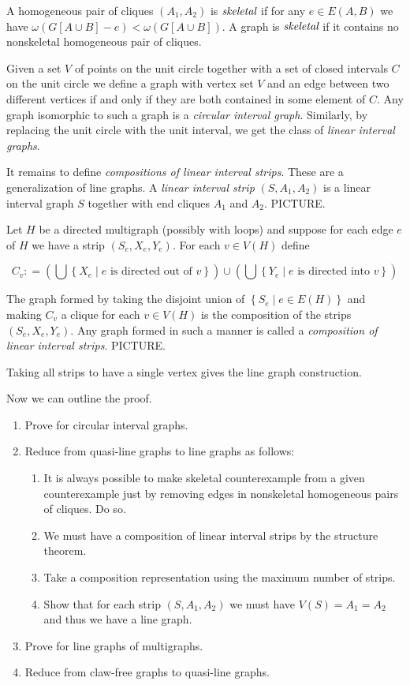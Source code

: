 \documentclass[12pt]{article}
\theoremstyle{plain}
\theoremstyle{definition}
\theoremstyle{remark}
\newcommand{\setbs}[2]{\left\{ #1 \mid #2 \right\}}
\newcommand{\parens}[1]{\left( #1 \right)}
\newcommand{\DefinedAs}{\mathrel{\mathop:}=}
\begin{document}
A homogeneous pair of cliques $(A_1, A_2)$ is $\emph{skeletal}$
if for any $e \in E(A, B)$ we have $\omega(G[A \cup B] - e) < \omega(G[A \cup
B])$.  A graph is $\emph{skeletal}$ if it contains no nonskeletal homogeneous
pair of cliques.  

\bigskip

Given a set $V$ of points on the unit circle together with a set of closed intervals $C$ on the unit circle we define a graph with vertex set $V$ and an edge between two different vertices if and only if they are both contained in some element of $C$.  Any graph isomorphic to such a graph is a \emph{circular interval graph}.  Similarly, by replacing the unit circle with the unit interval, we get the class of \emph{linear interval graphs}.

\bigskip

It remains to define \emph{compositions of linear interval strips}.  These are a generalization of line graphs. 
A \emph{linear interval strip} $(S, A_1, A_2)$ is a linear interval graph $S$ together with end cliques $A_1$ and $A_2$.  PICTURE.

\bigskip

Let $H$ be a directed multigraph (possibly with loops)
and suppose for each edge $e$ of $H$ we have a strip $(S_e, X_e, Y_e)$.  For
each $v \in V(H)$ define

\[C_v \DefinedAs \parens{\bigcup \setbs{X_e}{\text{$e$ is directed out of $v$}}}
\cup \parens{\bigcup \setbs{Y_e}{\text{$e$ is directed into $v$}}}\]

The graph formed by taking the disjoint union of $\setbs{S_e}{e \in E(H)}$ and
making $C_v$ a clique for each $v \in V(H)$ is the composition of the strips
$(S_e, X_e, Y_e)$.  Any graph formed in such a manner is called a
\emph{composition of linear interval strips}.  PICTURE.

Taking all strips to have a single vertex gives the line graph construction.

\bigskip\bigskip

Now we can outline the proof.

\begin{enumerate}
\item Prove for circular interval graphs.
\item Reduce from quasi-line graphs to line graphs as follows:
	\begin{enumerate}
	\item It is always possible to make skeletal counterexample from a given counterexample just by removing edges in nonskeletal homogeneous pairs of cliques.  Do so.
	\item We must have a composition of linear interval strips by the structure theorem.
	\item Take a composition representation using the maximum number of strips.
	\item Show that for each strip $(S, A_1, A_2)$ we must have $V(S) = A_1 = A_2$ and thus we have a line graph.
	\end{enumerate}
\item Prove for line graphs of multigraphs.
\item Reduce from claw-free graphs to quasi-line graphs.
\end{enumerate}
\end{document}
